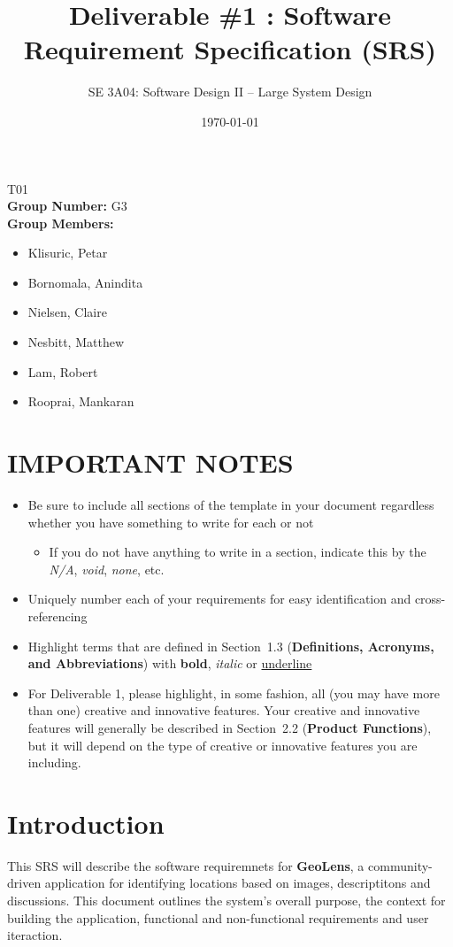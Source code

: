 \documentclass[]{article}
\title{Deliverable \#1 : Software Requirement Specification (SRS)}
\author{SE 3A04: Software Design II -- Large System Design}
\date{\today}
\begin{document}
\maketitle	
{} T01\\
{\bf Group Number:} G3 \\
{\bf Group Members:} 
\begin{itemize}
	\item Klisuric, Petar
    \item Bornomala, Anindita
    \item Nielsen, Claire
    \item Nesbitt, Matthew
    \item Lam, Robert 
    \item Rooprai, Mankaran
\end{itemize}

\section*{IMPORTANT NOTES}
\begin{itemize}
	\item Be sure to include all sections of the template in your document regardless whether you have something to write for each or not
	\begin{itemize}
		\item If you do not have anything to write in a section, indicate this by the \emph{N/A}, \emph{void}, \emph{none}, etc.
	\end{itemize}
	\item Uniquely number each of your requirements for easy identification and cross-referencing
	\item Highlight terms that are defined in Section~1.3 (\textbf{Definitions, Acronyms, and Abbreviations}) with \textbf{bold}, \emph{italic} or \underline{underline}
	\item For Deliverable 1, please highlight, in some fashion, all (you may have more than one) creative and innovative features. Your creative and innovative features will generally be described in Section~2.2 (\textbf{Product Functions}), but it will depend on the type of creative or innovative features you are including.
\end{itemize}

\newpage
\section{Introduction}
\label{sec:introduction}
This SRS will describe the software requiremnets for \textbf{GeoLens}, a community-driven application for identifying
locations based on images, descriptitons and discussions. This document outlines the system's overall purpose, the context for building the application,
functional and non-functional requirements and user iteraction.
\end{document}
